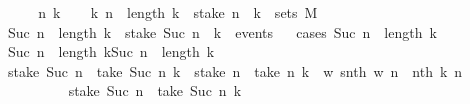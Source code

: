\begin{isabellebody}
\ \isanewline
\ \ \isamarkupfalse%
\ n\ k\isanewline
\ \ \isamarkupfalse%
\ {\isachardoublequoteopen}{\isasymAnd}k{}{\isachardot}{\kern0pt}\ n\ {\isasymle}\ length\ k{}\ {\isasymLongrightarrow}\ {\isacharparenleft}{\kern0pt}stake\ n\ {\isacharminus}{\kern0pt}{\isacharbackquote}{\kern0pt}\ {\isacharbraceleft}{\kern0pt}k{}{\isacharbraceright}{\kern0pt}{\isacharparenright}{\kern0pt}\ {\isasymin}\ sets\ M{\isachardoublequoteclose}\ \isanewline
\ \ \isamarkupfalse%
\ {\isachardoublequoteopen}Suc\ n\ {\isasymle}\ length\ k\ {\isasymLongrightarrow}\ stake\ {\isacharparenleft}{\kern0pt}Suc\ n{\isacharparenright}{\kern0pt}\ {\isacharminus}{\kern0pt}{\isacharbackquote}{\kern0pt}\ {\isacharbraceleft}{\kern0pt}k{\isacharbraceright}{\kern0pt}\ {\isasymin}\ events{\isachardoublequoteclose}\isanewline
\ \ \isamarkupfalse%
{\isacharparenleft}{\kern0pt}cases\ {\isachardoublequoteopen}Suc\ n\ {\isacharequal}{\kern0pt}\ length\ k{\isachardoublequoteclose}{\isacharparenright}{\kern0pt}\isanewline
\ \ \ \ \isamarkupfalse%
\ {\isachardoublequoteopen}Suc\ n\ {\isasymle}\ length\ k{\isachardoublequoteclose}{\isachardoublequoteopen}Suc\ n\ {\isacharequal}{\kern0pt}\ length\ k{\isachardoublequoteclose}\isanewline
\ \ \ \ \isamarkupfalse%
\ {\isachardoublequoteopen}{\isacharparenleft}{\kern0pt}stake\ {\isacharparenleft}{\kern0pt}Suc\ n{\isacharparenright}{\kern0pt}\ {\isacharminus}{\kern0pt}{\isacharbackquote}{\kern0pt}\ {\isacharbraceleft}{\kern0pt}take\ {\isacharparenleft}{\kern0pt}Suc\ n{\isacharparenright}{\kern0pt}\ k{\isacharbraceright}{\kern0pt}{\isacharparenright}{\kern0pt}\ {\isacharequal}{\kern0pt}\ {\isacharparenleft}{\kern0pt}stake\ n\ {\isacharminus}{\kern0pt}{\isacharbackquote}{\kern0pt}\ {\isacharbraceleft}{\kern0pt}take\ n\ k{\isacharbraceright}{\kern0pt}{\isacharparenright}{\kern0pt}\ {\isasyminter}\ {\isacharparenleft}{\kern0pt}{\isacharparenleft}{\kern0pt}{\isasymlambda}w{\isachardot}{\kern0pt}\ snth\ w\ n{\isacharparenright}{\kern0pt}\ {\isacharminus}{\kern0pt}{\isacharbackquote}{\kern0pt}\ {\isacharbraceleft}{\kern0pt}nth\ k\ n{\isacharbraceright}{\kern0pt}{\isacharparenright}{\kern0pt}{\isachardoublequoteclose}\isanewline
\ \ \ \ \isamarkupfalse%
\isanewline
\ \ \ \ \ \ \ \ \isamarkupfalse%
\ {\isachardoublequoteopen}stake\ {\isacharparenleft}{\kern0pt}Suc\ n{\isacharparenright}{\kern0pt}\ {\isacharminus}{\kern0pt}{\isacharbackquote}{\kern0pt}\ {\isacharbraceleft}{\kern0pt}take\ {\isacharparenleft}{\kern0pt}Suc\ n{\isacharparenright}{\kern0pt}\ k{\isacharbraceright}{\kern0pt}\isanewline

\end{isabellebody}

